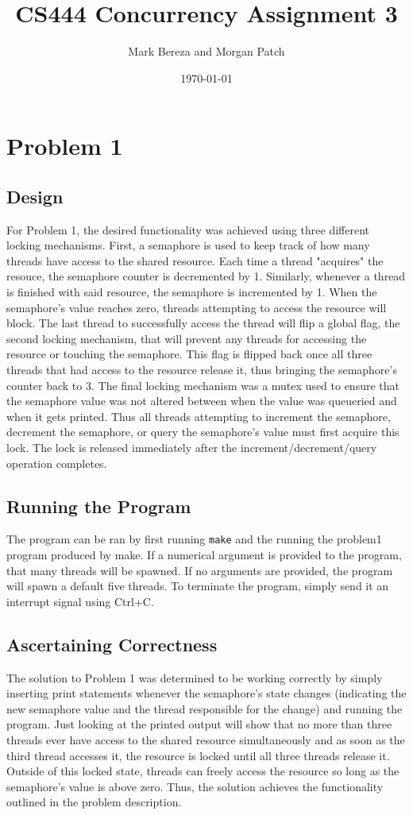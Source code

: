 \documentclass[onecolumn, draftclsnofoot,10pt, compsoc]{IEEEtran}
\begin{document}
\title{CS444 Concurrency Assignment 3}
\author{Mark Bereza and Morgan Patch}
\date{\today}
\maketitle
\section*{Problem 1}
\subsection*{Design}
For Problem 1, the desired functionality was achieved using three different locking mechanisms. First, a semaphore is used to keep track of how many threads have access to the shared resource. Each time a thread "acquires" the resouce, the semaphore counter is decremented by 1. Similarly, whenever a thread is finished with said resource, the semaphore is incremented by 1. When the semaphore's value reaches zero, threads attempting to access the resource will block. The last thread to successfully access the thread will flip a global flag, the second locking mechanism, that will prevent any threads for accessing the resource or touching the semaphore. This flag is flipped back once all three threads that had access to the resource release it, thus bringing the semaphore's counter back to 3. The final locking mechanism was a mutex used to ensure that the semaphore value was not altered between when the value was queueried and when it gets printed. Thus all threads attempting to increment the semaphore, decrement the semaphore, or query the semaphore's value must first acquire this lock. The lock is released immediately after the increment/decrement/query operation completes.

\subsection*{Running the Program}
The program can be ran by first running \verb+make+ and the running the problem1 program produced by make. If a numerical argument is provided to the program, that many threads will be spawned. If no arguments are provided, the program will spawn a default five threads. To terminate the program, simply send it an interrupt signal using Ctrl+C.

\subsection*{Ascertaining Correctness}
 The solution to Problem 1 was determined to be working correctly by simply inserting print statements whenever the semaphore's state changes (indicating the new semaphore value and the thread responsible for the change) and running the program. Just looking at the printed output will show that no more than three threads ever have access to the shared resource simultaneously and as soon as the third thread accesses it, the resource is locked until all three threads release it. Outside of this locked state, threads can freely access the resource so long as the semaphore's value is above zero. Thus, the solution achieves the functionality outlined in the problem description.
\end{document}
